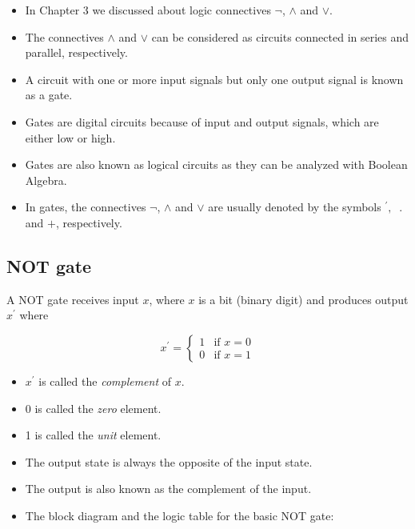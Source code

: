 \documentclass[]{book}
\providecommand{\tightlist}{%
  \setlength{\itemsep}{0pt}\setlength{\parskip}{0pt}}
\begin{document}
\begin{itemize}
\tightlist
\item
  In Chapter 3 we discussed about logic connectives \(\lnot\), \(\land\) and \(\lor\).
\item
  The connectives \(\land\) and \(\lor\) can be considered as circuits connected in series and parallel, respectively.
\item
  A circuit with one or more input signals but only one output signal is known as a gate.
\item
  Gates are digital circuits because of input and output signals, which are either low or high.
\item
  Gates are also known as logical circuits as they can be analyzed with Boolean Algebra.
\item
  In gates, the connectives \(\lnot\), \(\land\) and \(\lor\) are usually denoted by the symbols \(^\prime, \;\;.\) and \(+\), respectively.
\end{itemize}

\hypertarget{not-gate}{%
\subsection{NOT gate}\label{not-gate}}

A NOT gate receives input \(x\), where \(x\) is a bit (binary digit) and produces output \(x^\prime\) where

\begin{equation}
x^\prime =
\begin{cases} 
1 & \text{if } x=0\\
0 & \text{if } x=1
\end{cases}
\end{equation}

\begin{itemize}
\tightlist
\item
  \(x^\prime\) is called the \emph{complement} of \(x\).
\item
  0 is called the \emph{zero} element.
\item
  1 is called the \emph{unit} element.
\item
  The output state is always the opposite of the input state.
\item
  The output is also known as the complement of the input.
\item
  The block diagram and the logic table for the basic NOT gate:
\end{itemize}
\end{document}
